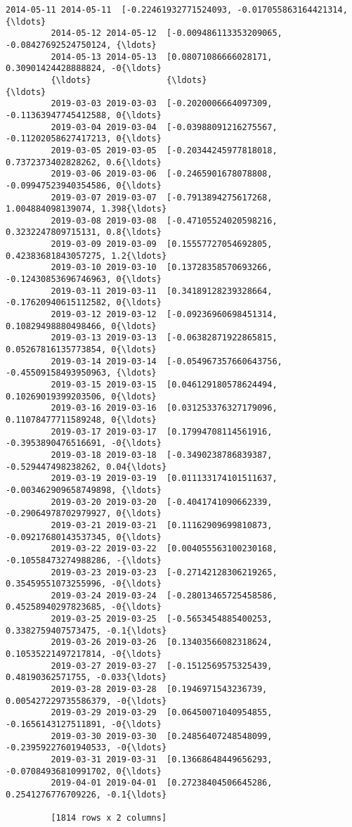 \documentclass[11pt]{article}
\begin{document}
\begin{Verbatim}[commandchars=\\\{\}]
         2014-05-11 2014-05-11  [-0.22461932771524093, -0.017055863164421314, {\ldots}
         2014-05-12 2014-05-12  [-0.009486113353209065, -0.08427692524750124, {\ldots}
         2014-05-13 2014-05-13  [0.08071086666028171, 0.30901424428888824, -0{\ldots}
         {\ldots}               {\ldots}                                                {\ldots}
         2019-03-03 2019-03-03  [-0.2020006664097309, -0.11363947745412588, 0{\ldots}
         2019-03-04 2019-03-04  [-0.03988091216275567, -0.11202058627417213, 0{\ldots}
         2019-03-05 2019-03-05  [-0.20344245977818018, 0.7372373402828262, 0.6{\ldots}
         2019-03-06 2019-03-06  [-0.2465901678078808, -0.09947523940354586, 0{\ldots}
         2019-03-07 2019-03-07  [-0.7913894275617268, 1.004884098139074, 1.398{\ldots}
         2019-03-08 2019-03-08  [-0.47105524020598216, 0.3232247809715131, 0.8{\ldots}
         2019-03-09 2019-03-09  [0.15557727054692805, 0.42383681843057275, 1.2{\ldots}
         2019-03-10 2019-03-10  [0.13728358570693266, -0.12430853696746963, 0{\ldots}
         2019-03-11 2019-03-11  [0.34189128239328664, -0.17620940615112582, 0{\ldots}
         2019-03-12 2019-03-12  [-0.09236960698451314, 0.10829498880498466, 0{\ldots}
         2019-03-13 2019-03-13  [-0.06382871922865815, 0.05267816135773854, 0{\ldots}
         2019-03-14 2019-03-14  [-0.054967357660643756, -0.45509158493950963, {\ldots}
         2019-03-15 2019-03-15  [0.046129180578624494, 0.10269019399203506, 0{\ldots}
         2019-03-16 2019-03-16  [0.031253376327179096, 0.11078477711589248, 0{\ldots}
         2019-03-17 2019-03-17  [0.17994708114561916, -0.3953890476516691, -0{\ldots}
         2019-03-18 2019-03-18  [-0.3490238786839387, -0.529447498238262, 0.04{\ldots}
         2019-03-19 2019-03-19  [0.011133174101511637, -0.003462909658749898, {\ldots}
         2019-03-20 2019-03-20  [-0.4041741090662339, -0.29064978702979927, 0{\ldots}
         2019-03-21 2019-03-21  [0.11162909699810873, -0.09217680143537345, 0{\ldots}
         2019-03-22 2019-03-22  [0.004055563100230168, -0.10558473274988286, -{\ldots}
         2019-03-23 2019-03-23  [-0.27142128306219265, 0.35459551073255996, -0{\ldots}
         2019-03-24 2019-03-24  [-0.28013465725458586, 0.45258940297823685, -0{\ldots}
         2019-03-25 2019-03-25  [-0.5653454885400253, 0.3382759407573475, -0.1{\ldots}
         2019-03-26 2019-03-26  [0.13403566082318624, 0.10535221497217814, -0{\ldots}
         2019-03-27 2019-03-27  [-0.1512569575325439, 0.48190362571755, -0.033{\ldots}
         2019-03-28 2019-03-28  [0.1946971543236739, 0.005427229735586379, -0{\ldots}
         2019-03-29 2019-03-29  [0.06450071040954855, -0.1656143127511891, -0{\ldots}
         2019-03-30 2019-03-30  [0.24856407248548099, -0.23959227601940533, -0{\ldots}
         2019-03-31 2019-03-31  [0.13668648449656293, -0.07084936810991702, 0{\ldots}
         2019-04-01 2019-04-01  [0.27238404506645286, 0.2541276776709226, -0.1{\ldots}
         
         [1814 rows x 2 columns]
\end{Verbatim}
            
\end{document}
